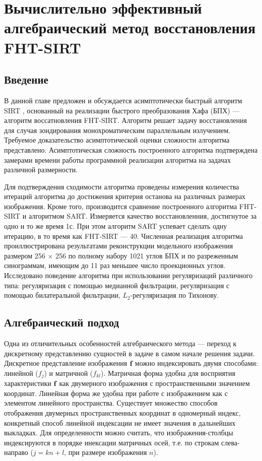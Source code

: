 
\newcommand{\rom}[1]{%
  \textup{\uppercase\expandafter{\romannumeral#1}}%
}

\chapter{Вычислительно эффективный алгебраический метод восстановления FHT-SIRT} \label{chapt1}

\section{Введение}

В данной главе предложен и обсуждается асимптотически быстрый алгоритм SIRT \cite{GILBERTSIRT}, основанный на реализации быстрого преобразования Хафа (БПХ) \cite{hough} --- алгоритм воссатновления FHT-SIRT.
Алгоритм решает задачу восстановления для случая зондирования монохроматическим параллельным излучением.
Требуемое доказательство асимптотической оценки сложности алгоритма представлено.
Асимптотическая сложность построенного алгоритма подтверждена замерами времени работы программной реализации алгоритма на задачах различной размерности.

Для подтверждения сходимости алгоритма проведены измерения количества итераций алгоритма до достижения критерия останова на различных размерах изображения.
Кроме того, производится сравнение построенного алгоритма FHT-SIRT и алгоритмом SART. 
Измеряется качество восстановленния, достигнутое за одно и то же время 1с. При этом алгоритм SART успевает сделать одну итерацию, в то время как FHT-SIRT --- 40.
Численная реализация алгоритма проиллюстрирована результатами реконструкции модельного изображения размером 256 $\times$ 256 по полному набору 1021 углов БПХ и по разреженным синограммам, имеющим до 11 раз меньшее число проекционных углов.
Исследовано поведение алгоритма при использовании регуляризаций различного типа: регуляризация с помощью медианной фильтрации, регуляризация с помощью билатеральной фильтрации, $L_2$-регуляризация по Тихонову.


\section{Алгебраический подход}
Одна из отличительных особенностей алгебраического метода --- переход к дискретному представлению сущностей в задаче в самом начале решения задачи.
Дискретное представление изображения $\textbf f$ можно индексировать двумя способами: линейной ($f_j$) и матричной ($f_{kl}$). 
Матричная форма удобна для восприятия характеристики $\textbf f$ как двумерного изображения с пространственными значением координат.
Линейная форма же удобна при работе с изображением как с элементом линейного пространства.
Существует множество способов отображения двумерных пространственных координат в одномерный индекс, конкретный способ линейной индексации не имеет значения в дальнейших выкладках.
Для определенности можно считать, что изображения-столбцы индексируются в порядке инексации матричных осей, т.е. по строкам слева-направо ($j = kn + l$, при размере изображения $n$).


